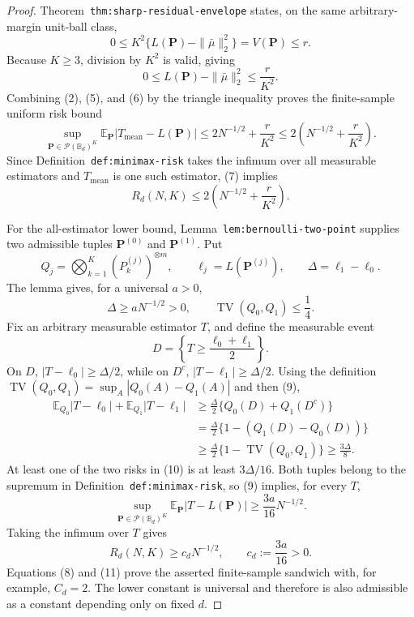 \documentclass{article}
\begin{document}
\begin{proof}
Theorem~\texttt{thm:sharp-residual-envelope} states, on the same arbitrary-margin unit-ball class,
\[
0\leq K^2\{L(\mathbf P)-\|\bar\mu\|_2^2\}=V(\mathbf P)\leq r.
\]
Because \(K\geq3\), division by \(K^2\) is valid, giving
\[
0\leq L(\mathbf P)-\|\bar\mu\|_2^2\leq \frac r{K^2}.
\tag{6}
\]
Combining (2), (5), and (6) by the triangle inequality proves the finite-sample uniform risk bound
\[
\sup_{\mathbf P\in\mathcal P(\mathbb B_d)^K}
\mathbb E_{\mathbf P}|T_{\mathrm{mean}}-L(\mathbf P)|
\leq 2N^{-1/2}+\frac r{K^2}
\leq 2\left(N^{-1/2}+\frac r{K^2}\right).
\tag{7}
\]
Since Definition~\texttt{def:minimax-risk} takes the infimum over all measurable estimators and \(T_{\mathrm{mean}}\) is one such estimator, (7) implies
\[
R_d(N,K)\leq 2\left(N^{-1/2}+\frac r{K^2}\right).
\tag{8}
\]

For the all-estimator lower bound, Lemma~\texttt{lem:bernoulli-two-point} supplies two admissible tuples \(\mathbf P^{(0)}\) and \(\mathbf P^{(1)}\).  Put
\[
Q_j=\bigotimes_{k=1}^K(P_k^{(j)})^{\otimes m},
\qquad
\ell_j=L(\mathbf P^{(j)}),
\qquad
\Delta=\ell_1-\ell_0.
\]
The lemma gives, for a universal \(a>0\),
\[
\Delta\geq aN^{-1/2}>0,
\qquad
\operatorname{TV}(Q_0,Q_1)\leq\frac14.
\tag{9}
\]
Fix an arbitrary measurable estimator \(T\), and define the measurable event
\[
D=\left\{T\geq\frac{\ell_0+\ell_1}{2}\right\}.
\]
On \(D\), \(|T-\ell_0|\geq\Delta/2\), while on \(D^c\), \(|T-\ell_1|\geq\Delta/2\).  Using the definition \(\operatorname{TV}(Q_0,Q_1)=\sup_A|Q_0(A)-Q_1(A)|\) and then (9),
\[
\begin{aligned}
\mathbb E_{Q_0}|T-\ell_0|+\mathbb E_{Q_1}|T-\ell_1|
&\geq\frac\Delta2\{Q_0(D)+Q_1(D^c)\}\\
&=\frac\Delta2\{1-(Q_1(D)-Q_0(D))\}\\
&\geq\frac\Delta2\{1-\operatorname{TV}(Q_0,Q_1)\}
\geq\frac{3\Delta}{8}.
\end{aligned}
\tag{10}
\]
At least one of the two risks in (10) is at least \(3\Delta/16\).  Both tuples belong to the supremum in Definition~\texttt{def:minimax-risk}, so (9) implies, for every \(T\),
\[
\sup_{\mathbf P\in\mathcal P(\mathbb B_d)^K}
\mathbb E_{\mathbf P}|T-L(\mathbf P)|
\geq\frac{3a}{16}N^{-1/2}.
\]
Taking the infimum over \(T\) gives
\[
R_d(N,K)\geq c_dN^{-1/2},
\qquad c_d:=\frac{3a}{16}>0.
\tag{11}
\]
Equations (8) and (11) prove the asserted finite-sample sandwich with, for example, \(C_d=2\).  The lower constant is universal and therefore is also admissible as a constant depending only on fixed \(d\).


\end{proof}
\end{document}
